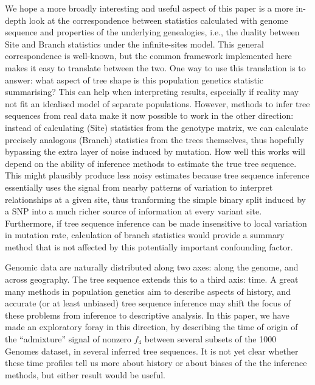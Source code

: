 \documentclass{article}
\begin{document}
We hope a more broadly interesting and useful aspect of this paper
is a more in-depth look at the correspondence between statistics calculated with genome sequence
and properties of the underlying genealogies, i.e.,
the duality between Site and Branch statistics under the infinite-sites model.
This general correspondence is well-known,
but the common framework implemented here makes it easy to translate between the two.
One way to use this translation is to answer:
what aspect of tree shape is this population genetics statistic summarising?
This can help when interpreting results, especially if reality may not fit an idealised model
of separate populations.
However, methods to infer tree sequences from real data
make it now possible to work in the other direction:
instead of calculating (Site) statistics from the genotype matrix,
we can calculate precisely analogous (Branch) statistics from the trees themselves,
thus hopefully bypassing the extra layer of noise induced by mutation.
How well this works will depend on the ability of inference methods
to estimate the true tree sequence.
This might plausibly produce less noisy estimates because tree sequence inference
essentially uses the signal from nearby patterns of variation
to interpret relationships at a given site,
thus tranforming the simple binary split induced by a SNP
into a much richer source of information at every variant site.
Furthermore,
if tree sequence inference can be made insensitive to local variation in mutation rate,
calculation of branch statistics would provide a summary method
that is not affected by this potentially important confounding factor.

Genomic data are naturally distributed along two axes: along the genome, and across geography.
The tree sequence extends this to a third axis: time.
A great many methods in population genetics aim to describe aspects of history,
and accurate (or at least unbiased) tree sequence inference
may shift the focus of these problems from inference to descriptive analysis.
In this paper, we have made an exploratory foray in this direction,
by describing the time of origin of the ``admixture'' signal of nonzero $f_4$
between several subsets of the 1000 Genomes dataset,
in several inferred tree sequences.
It is not yet clear whether these time profiles tell us more about history
or about biases of the the inference methods,
but either result would be useful.
\end{document}
